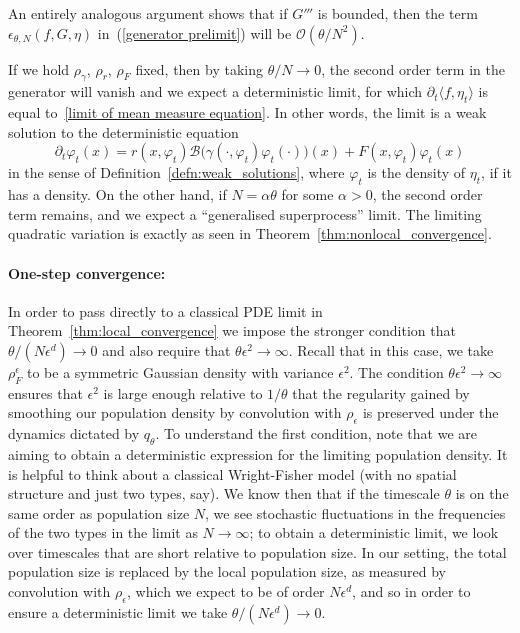 \documentclass[EJP]{ejpecp} %
\newcommand{\bigO}{\mathcal{O}}
\newcommand{\DG}{\mathcal{B}}  %
\begin{document}
An entirely analogous argument shows that if $G'''$ is bounded, then
the term $\epsilon_{\theta,N}(f, G, \eta)$ 
in~(\ref{generator prelimit}) will be $\bigO(\theta/N^2)$. 

If we hold $\rho_\gamma$, $\rho_r$, $\rho_F$ fixed, then 
by taking $\theta/N \rightarrow 0$, the second order term in the generator 
will vanish and we expect a deterministic limit,
for which $\partial_t \langle f, \eta_t \rangle$ is equal to~\eqref{limit of mean measure equation}.
In other words, the limit is a weak solution to the deterministic equation
\begin{equation}
\label{deterministic limit}
\partial_t\varphi_t(x)
=
    r(x,\varphi_t)
    \DG\big(
        \gamma(\cdot,\varphi_t) \varphi_t(\cdot)
    \big)(x)
    + F(x, \varphi_t) \varphi_t(x) 
\end{equation}
in the sense of Definition~\ref{defn:weak_solutions},
where $\varphi_t$ is the density of $\eta_t$, if it has a density.
On the other hand, if $N = \alpha \theta$ for some $\alpha > 0$,
the second order term remains, and we expect a ``generalised superprocess'' limit.
The limiting quadratic variation
is exactly as seen in Theorem~\ref{thm:nonlocal_convergence}.

\paragraph{One-step convergence:} \label{sec:one_step_heuristics} 
In order to pass directly to a classical PDE limit
in Theorem~\ref{thm:local_convergence}
we impose the stronger condition
that $\theta/(N\epsilon^d) \to 0$ and also require that
$\theta\epsilon^2\to\infty$. 
Recall that in this case, we take $\rho_F^\epsilon$ 
to be a symmetric Gaussian density with variance 
$\epsilon^2$. The condition $\theta\epsilon^2\to\infty$ 
ensures that $\epsilon^2$ is large enough relative to $1/\theta$
that the regularity gained by smoothing our population density by convolution with
$\rho_\epsilon$ is preserved under the dynamics dictated by $q_{\theta}$.
To understand the first condition, note that we are aiming to obtain a 
deterministic expression for the limiting population density. 
It is helpful to think
about a classical Wright-Fisher model (with no spatial structure and just two types, say). 
We know then that if the
timescale $\theta$ is on the same order as population size $N$, we see stochastic
fluctuations in the frequencies of the two types in the limit as $N\to\infty$; to 
obtain a deterministic limit, we look over timescales that are short relative to population
size. In our setting, the total population size is replaced by the local population
size, as measured by convolution with $\rho_{\epsilon}$, which we expect to be 
of order $N\epsilon^d$, and so in order to ensure a deterministic limit we 
take $\theta/(N\epsilon^d)\to 0$.
\end{document}
